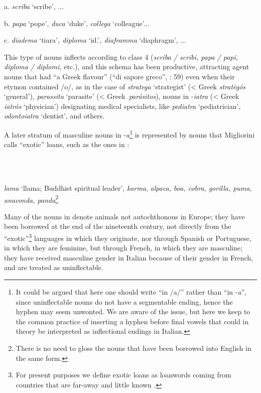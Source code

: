 \documentclass[output=paper]{langscibook}
\begin{document}
          a.   \textit{scriba} ‘scribe’, ...

  b.  \textit{papa} ‘pope’, \textit{duca} ‘duke’, \textit{collega} ‘colleague’...

c.  \textit{diadema} ‘tiara’\textit{, diploma} ‘id.’\textit{, diaframma} ‘diaphragm’, ... 

This type of nouns inflects according to class 4 (\textit{scriba / scribi, papa / papi, diploma / diplomi,} etc.), and this schema has been productive, attracting agent nouns that had “a Greek flavour” (“di sapore greco”, \citealt{Migliorini1957}: 59) even when their etymon contained /o/, as in the case of \textit{stratega} ‘strategist’ (< Greek \textit{stratēgós} ‘general’), \textit{parassita} ‘parasite’ (< Greek{~}\textit{parásitos}), nouns in \nobreakdash-\textit{iatra} (< Greek \textit{iatrós} ‘physician’) designating medical specialists, like \textit{pediatra} ‘pediatrician’, \textit{odontoiatra} ‘dentist’, and others.

A later stratum of masculine nouns in \nobreakdash-\textit{a}\footnote{It could be argued that here one should write “in /a/” rather than “in \nobreakdash-\textit{a}”, since uninflectable nouns do not have a segmentable ending, hence the hyphen may seem unwonted. We are aware of the issue, but here we keep to the common practice of inserting a hyphen before final vowels that could in theory be interpreted as inflectional endings in Italian.} is represented by nouns that Migliorini calls “exotic” loans, such as the ones in :

\ea%
    \label{ex:key:10}
    \gll \\
         \\
    \glt
    \z %

          \textit{lama} ‘llama; Buddhist spiritual leader’, \textit{karma}, \textit{alpaca, boa, cobra, gorilla, puma, anaconda, panda}\footnote{There is no need to gloss the nouns that have been borrowed into English in the same form.}

Many of the nouns in  denote animals not autochthonous in Europe; they have been borrowed at the end of the nineteenth century, not directly from the “exotic”\footnote{For present purposes we define exotic loans as loanwords coming from countries that are far-away and little known \citep[7]{Mancini1992}.} languages in which they originate, nor through Spanish or Portuguese, in which they are feminine, but through French, in which they are masculine; they have received masculine gender in Italian because of their gender in French, and are treated as uninflectable.
\end{document}
